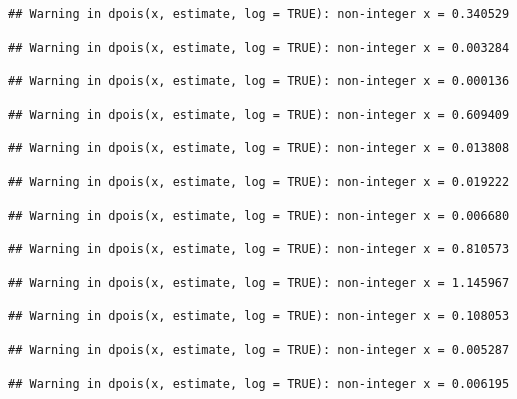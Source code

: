 \documentclass[]{article}
\begin{document}
\begin{verbatim}
## Warning in dpois(x, estimate, log = TRUE): non-integer x = 0.340529
\end{verbatim}

\begin{verbatim}
## Warning in dpois(x, estimate, log = TRUE): non-integer x = 0.003284
\end{verbatim}

\begin{verbatim}
## Warning in dpois(x, estimate, log = TRUE): non-integer x = 0.000136
\end{verbatim}

\begin{verbatim}
## Warning in dpois(x, estimate, log = TRUE): non-integer x = 0.609409
\end{verbatim}

\begin{verbatim}
## Warning in dpois(x, estimate, log = TRUE): non-integer x = 0.013808
\end{verbatim}

\begin{verbatim}
## Warning in dpois(x, estimate, log = TRUE): non-integer x = 0.019222
\end{verbatim}

\begin{verbatim}
## Warning in dpois(x, estimate, log = TRUE): non-integer x = 0.006680
\end{verbatim}

\begin{verbatim}
## Warning in dpois(x, estimate, log = TRUE): non-integer x = 0.810573
\end{verbatim}

\begin{verbatim}
## Warning in dpois(x, estimate, log = TRUE): non-integer x = 1.145967
\end{verbatim}

\begin{verbatim}
## Warning in dpois(x, estimate, log = TRUE): non-integer x = 0.108053
\end{verbatim}

\begin{verbatim}
## Warning in dpois(x, estimate, log = TRUE): non-integer x = 0.005287
\end{verbatim}

\begin{verbatim}
## Warning in dpois(x, estimate, log = TRUE): non-integer x = 0.006195
\end{verbatim}
\end{document}
